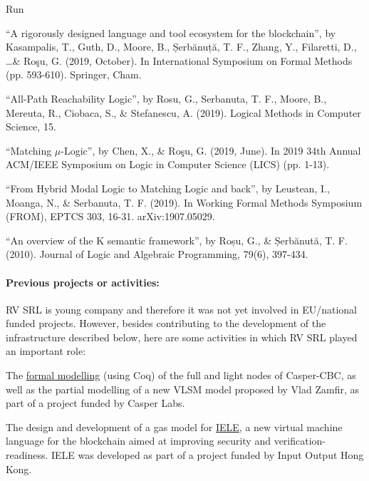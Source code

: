 \begin{sitedescription}{Run}
\begin{compactitem}
\item ``A rigorously designed language and tool ecosystem for the blockchain'', by Kasampalis, T., Guth, D., Moore, B., Șerbănuță, T. F., Zhang, Y., Filaretti, D., \ldots \& Roşu, G. (2019, October). In International Symposium on Formal Methods (pp. 593-610). Springer, Cham.
\item ``All-Path Reachability Logic'', by Rosu, G., Serbanuta, T. F., Moore, B., Mereuta, R., Ciobaca, S., \& Stefanescu, A. (2019). Logical Methods in Computer Science, 15.
\item ``Matching $\mu$-Logic'', by Chen, X., \& Roşu, G. (2019, June). In 2019 34th Annual ACM/IEEE Symposium on Logic in Computer Science (LICS) (pp. 1-13).
\item ``From Hybrid Modal Logic to Matching Logic and back'', by Leustean, I., Moanga, N., \& Serbanuta, T. F. (2019). In Working Formal Methods Symposium (FROM), EPTCS 303, 16-31. arXiv:1907.05029.
\item ``An overview of the K semantic framework'', by Roșu, G., \& Șerbănută, T. F. (2010).  Journal of Logic and Algebraic Programming, 79(6), 397-434.
\end{compactitem}

\paragraph*{Previous projects or activities:}


RV SRL is young company and therefore it was not yet involved in EU/national funded projects.
However, besides contributing to the development of the infrastructure described below,
here are some activities in which RV SRL played an important role:
\begin{compactitem}
\item The \href{https://github.com/runtimeverification/casper-cbc-proofs}{formal modelling}
(using Coq) of the full and light nodes of Casper-CBC, as well as the partial
modelling of a new VLSM model proposed by Vlad Zamfir, as part of a
project funded by Casper Labs.
\item The design and development of a gas model for
\href{https://github.com/runtimeverification/iele-semantics}{IELE}, a new
virtual machine language for the blockchain aimed at improving security and
verification-readiness. IELE was developed as part of a project funded
by Input Output Hong Kong.
\end{compactitem}


\end{sitedescription}
